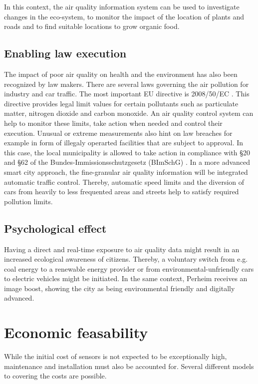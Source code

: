 \documentclass[conference]{IEEEtran}
\begin{document}
In this context, the air quality information system can be used to investigate changes in the eco-system, to monitor the impact of the location of plants and roads and to find suitable locations to grow organic food.

\subsection{Enabling law execution}
The impact of poor air quality on health and the environment has also been recognized by law makers. There are several laws governing the air pollution for industry and car traffic. The most important EU directive is 2008/50/EC \cite{EurpoeanUnion.2008}. This directive provides legal limit values for certain pollutants such as particulate matter, nitrogen dioxide and carbon monoxide. An air quality control system can help to monitor these limits, take action when needed and control their execution. Unusual or extreme measurements also hint on law breaches for example in form of illegaly operarted facilities that are subject to approval. In this case, the local municipality is allowed to take action in compliance with \S20 and \S62 of the Bundes-Immissionsschutzgesetz (BImSchG) \cite{BundesrepublikDeutschland.1974}. In a more advanced smart city approach, the fine-granular air quality information will be integrated automatic traffic control. Thereby, automatic speed limits and the diversion of cars from heavily to less frequented areas and streets help to satisfy required pollution limits.

\subsection{Psychological effect}
Having a direct and real-time exposure to air quality data might result in an increased ecological awareness of citizens. Thereby, a voluntary switch from e.g. coal energy to a renewable energy provider or from environmental-unfriendly cars to electric vehicles might be initiated. In the same context, Perheim receives an image boost, showing the city as being environmental friendly and digitally advanced.

\section{Economic feasability}
While the initial cost of sensors is not expected to be exceptionally high, maintenance and installation must also be accounted for. Several different models to covering the costs are possible.
\end{document}
